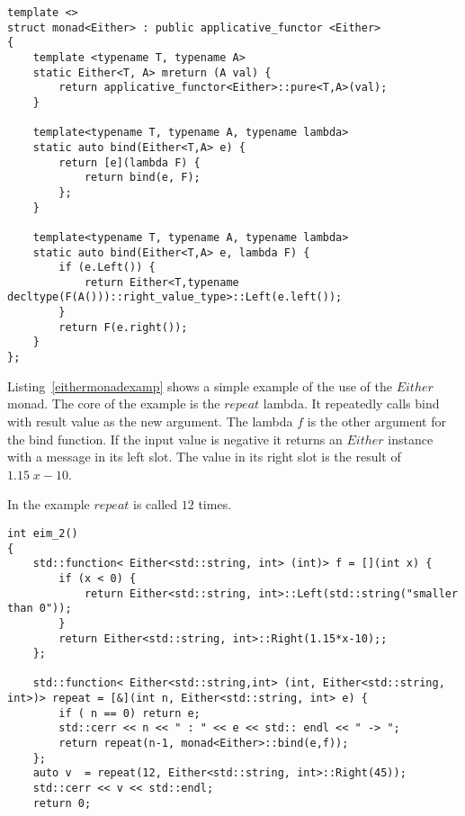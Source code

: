 \documentclass[12pt,fleqn]{article}
\begin{document}
%
%
\begin{minipage}{\linewidth}
\begin{lstlisting}[caption=Either monad,label=eithermonad]
template <>
struct monad<Either> : public applicative_functor <Either>
{
	template <typename T, typename A> 
	static Either<T, A> mreturn (A val) {
		return applicative_functor<Either>::pure<T,A>(val);
	}
	
	template<typename T, typename A, typename lambda>
	static auto bind(Either<T,A> e) {
		return [e](lambda F) {
			return bind(e, F);
		};
	}

	template<typename T, typename A, typename lambda> 
	static auto bind(Either<T,A> e, lambda F) {
		if (e.Left()) {
			return Either<T,typename decltype(F(A()))::right_value_type>::Left(e.left());
		}
		return F(e.right());
	}
};
\end{lstlisting}
\end{minipage}
%
%
%

Listing~\ref{eithermonadexamp} shows a simple example of the use of the $Either$ monad.
The core of the example is the $repeat$ lambda. 
It repeatedly calls bind with result value as the new argument.
The lambda $f$ is the other argument for the bind function.
If the input value is negative it returns an $Either$ instance with a message in its left slot.
The value in its right slot is the result of $1.15 \; x - 10$.

In the example $repeat$ is called $12$ times.

%
%
\begin{minipage}{\linewidth}
\begin{lstlisting}[caption=Example of the Either monad,label=eithermonadexamp]
int eim_2()
{
	std::function< Either<std::string, int> (int)> f = [](int x) {
		if (x < 0) {
			return Either<std::string, int>::Left(std::string("smaller than 0"));
		}
		return Either<std::string, int>::Right(1.15*x-10);;
	};

	std::function< Either<std::string,int> (int, Either<std::string, int>)> repeat = [&](int n, Either<std::string, int> e) {
		if ( n == 0) return e;
		std::cerr << n << " : " << e << std:: endl << " -> ";
		return repeat(n-1, monad<Either>::bind(e,f));
	}; 
	auto v  = repeat(12, Either<std::string, int>::Right(45));
	std::cerr << v << std::endl;
	return 0;
\end{lstlisting}
\end{minipage}
%
%
%


\end{document}
